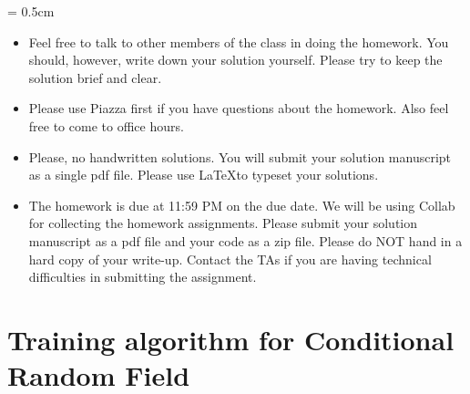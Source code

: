 
\usepackage{graphicx}
\usepackage{subfigure}
\usepackage{amsmath}
\usepackage{amssymb}
\usepackage{epsfig}
\usepackage{enumerate}
\usepackage{color}
\usepackage{algorithmic}
\usepackage{hyperref}


\sloppy
\parskip = 0.5cm

\newcommand{\ignore}[1]{}
\newcommand{\pp}{\noindent}
\newcommand{\ov}{\overline}
\newcommand{\bb}[1]{{\bf #1}}
\renewcommand{\labelitemii}{\tiny$\circ$}

\newcommand{\question}[1]{#1}%
%
\newcommand{\answer}[2]{{
\vspace{10pt} 
\color{red}{#2}
\vspace{10pt}
}
}
\newcommand{\comment}[1]{}


\oddsidemargin 0in
\evensidemargin 0in
\textwidth 6.5in
\topmargin -0.5in
\textheight 9.0in


\setlength{\unitlength}{1mm}

\thispagestyle{plain}
\newpage
{}

\begin{itemize}
\item Feel free to talk to other members of the class in doing the homework. You should, however,
write down your solution yourself.  Please try to keep the solution brief and clear.

\item Please use Piazza first if you have questions about the homework. Also feel free to come to office hours.

\item Please, no handwritten solutions. You will submit your solution manuscript as a single pdf file. Please use \LaTeX to typeset your solutions.

\item The homework is due at 11:59 PM on the due date. We will be using
Collab for collecting the homework assignments. Please submit your solution manuscript as a pdf file and your code as a zip file.  Please do NOT hand in a hard copy of your write-up.
Contact the TAs if you are having technical difficulties in 
submitting the assignment. 
\end{itemize}



\section{Training algorithm for Conditional Random Field} 


